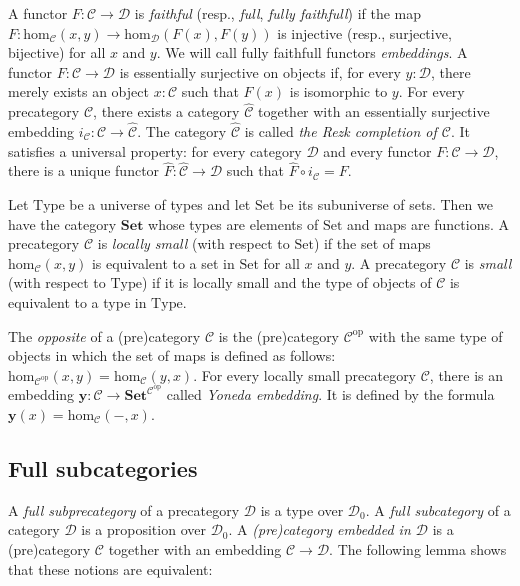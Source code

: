 \documentclass[reqno]{amsart}
\theoremstyle{definition}
\theoremstyle{remark}
\newcommand{\fs}[1]{\mathrm{#1}}
\newcommand{\cat}[1]{\mathbf{#1}}
\newcommand{\scat}[1]{\mathcal{#1}}
\renewcommand{\hom}{\fs{hom}}
\newcommand{\Set}{\cat{Set}}
\newcommand{\uSet}{\fs{Set}}
\newcommand{\uType}{\fs{Type}}
\newcommand{\ob}[1]{#1_0}
\numberwithin{figure}{section}
\begin{document}
A functor $F : \scat{C} \to \scat{D}$ is \emph{faithful} (resp., \emph{full}, \emph{fully faithfull}) if the map $F : \hom_\scat{C}(x,y) \to \hom_\scat{D}(F(x),F(y))$ is injective (resp., surjective, bijective) for all $x$ and $y$.
We will call fully faithfull functors \emph{embeddings}.
A functor $F : \scat{C} \to \scat{D}$ is essentially surjective on objects if, for every $y : \scat{D}$, there merely exists an object $x : \scat{C}$ such that $F(x)$ is isomorphic to $y$.
For every precategory $\scat{C}$, there exists a category $\widehat{\scat{C}}$ together with an essentially surjective embedding $i_\scat{C} : \scat{C} \to \widehat{\scat{C}}$.
The category $\widehat{\scat{C}}$ is called \emph{the Rezk completion of $\scat{C}$}.
It satisfies a universal property: for every category $\scat{D}$ and every functor $F : \scat{C} \to \scat{D}$, there is a unique functor $\widehat{F} : \widehat{\scat{C}} \to \scat{D}$ such that $\widehat{F} \circ i_\scat{C} = F$.

Let $\uType$ be a universe of types and let $\uSet$ be its subuniverse of sets.
Then we have the category $\Set$ whose types are elements of $\uSet$ and maps are functions.
A precategory $\scat{C}$ is \emph{locally small} (with respect to $\uSet$) if the set of maps $\hom_\scat{C}(x,y)$ is equivalent to a set in $\uSet$ for all $x$ and $y$.
A precategory $\scat{C}$ is \emph{small} (with respect to $\uType$) if it is locally small and the type of objects of $\scat{C}$ is equivalent to a type in $\uType$.

The \emph{opposite} of a (pre)category $\scat{C}$ is the (pre)category $\scat{C}^\fs{op}$ with the same type of objects in which the set of maps is defined as follows: $\hom_{\scat{C}^\fs{op}}(x,y) = \hom_\scat{C}(y,x)$.
For every locally small precategory $\scat{C}$, there is an embedding $\cat{y} : \scat{C} \to \Set^{\scat{C}^\fs{op}}$ called \emph{Yoneda embedding}.
It is defined by the formula $\cat{y}(x) = \hom_\scat{C}(-,x)$.

\subsection{Full subcategories}

A \emph{full subprecategory} of a precategory $\scat{D}$ is a type over $\ob{\scat{D}}$.
A \emph{full subcategory} of a category $\scat{D}$ is a proposition over $\ob{\scat{D}}$.
A \emph{(pre)category embedded in $\scat{D}$} is a (pre)category $\scat{C}$ together with an embedding $\scat{C} \to \scat{D}$.
The following lemma shows that these notions are equivalent:
\end{document}
